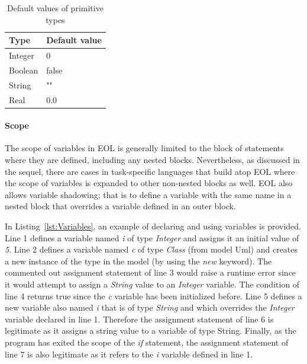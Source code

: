 \begin{table}[h]
  \centering
  \caption{Default values of primitive types}
  \label{tab:DefaultValuesOfPrimitiveTypes}
  \begin{tabular}{|l|l|}
    \hline
    \textbf{Type} & \textbf{Default value} \\\hline
    Integer       & 0                      \\\hline
    Boolean       & false                  \\\hline
    String        & ""                     \\\hline
    Real          & 0.0                    \\\hline
  \end{tabular}
\end{table}

\paragraph{Scope} The scope of variables in EOL is generally limited to the block of statements where they are defined, including any nested blocks. Nevertheless, as discussed in the sequel, there are cases in task-specific languages that build atop EOL where the scope of variables is expanded to other non-nested blocks as well. EOL also allows variable shadowing; that is to define a variable with the same name in a nested block that overrides a variable defined in an outer block. 

In Listing~\ref{lst:Variables}, an example of declaring and using variables is provided. Line 1 defines a variable named \emph{i} of type \emph{Integer} and assigns it an initial value of \emph{5}. Line 2 defines a variable named \emph{c} of type \emph{Class} (from model Uml) and creates a new instance of the type in the model (by using the \emph{new} keyword). The commented out assignment statement of line 3 would raise a runtime error since it would attempt to assign a \emph{String} value to an \emph{Integer} variable. The condition of line 4 returns true since the \emph{c} variable has been initialized before. Line 5 defines a new variable also named \emph{i} that is of type \emph{String} and which overrides the \emph{Integer} variable declared in line 1. Therefore the assignment statement of line 6 is legitimate as it assigns a string value to a variable of type String. Finally, as the program has exited the scope of the \emph{if} statement, the assignment statement of line 7 is also legitimate as it refers to the \emph{i} variable defined in line 1.


